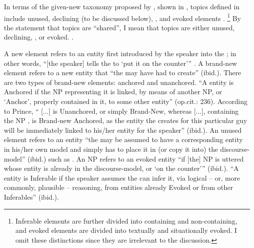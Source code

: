 In terms of the given-new taxonomy proposed by , shown in \Next,
topics defined in \Last include unused, declining (to be discussed below), , and evoked elements \cite[\S 4.4.2]{lambrecht94}.%
 \footnote{
 Inferable elements are further divided into containing and non-containing, and
 evoked elements are divided into textually and situationally evoked.
 I omit these distinctions since they are irrelevant to the discussion.
 }
%
By the statement that topics are ``shared'',
I mean that topics are either unused, declining, , or evoked.
\vspace{0.5cm}
%
\ex.\label{Back:Top:DefTop:GNTaxonomy}


\hfill{\cite[modified from][237]{prince81}}
\vspace{0.5cm}

A new element refers to an entity first introduced by the speaker into the ;
in other words, ``[the speaker] tells the  to `put it on the counter''' \cite[235]{prince81}.
A brand-new element refers to a new entity that ``the  may have had to create'' (ibid.).
There are two types of brand-new elements: anchored and unanchored.
``A  entity is Anchored if the NP representing it is linked, by means of another NP, or `Anchor', properly contained in it, to some other  entity'' (op.cit.: 236).
According to Prince, `` [...] is Unanchored, or simply Brand-New, whereas  [...], containing the NP , is Brand-new Anchored, as the  entity the  creates for this particular guy will be immediately linked to his/her  entity for the speaker'' (ibid.).
An unused element refers to an entity ``the  may be assumed to have a corresponding entity in his/her own model and simply has to place it in (or copy it into) the discourse-model'' (ibid.) such as .
An NP refers to an evoked entity ``if [the] NP is uttered whose entity is already in the discourse-model, or `on the counter''' (ibid.).
``A  entity is Inferable if the speaker assumes the  can infer it, via logical -- or, more commonly, plausible -- reasoning, from  entities already Evoked or from other Inferables'' (ibid.).


